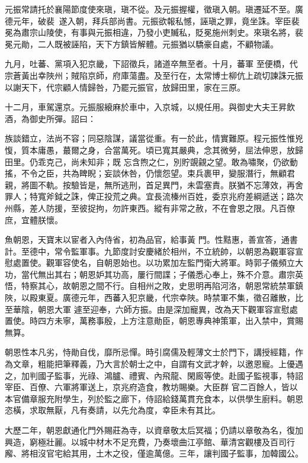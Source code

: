 \begin{pinyinscope}
 元振常請托於襄陽節度使來瑱，瑱不從。及元振握權，徵瑱入朝。瑱遷延不至。廣德元年，破裴，遂入朝，拜兵部尚書。元振欲報私憾，誣瑱之罪，竟坐誅。宰臣裴冕為肅宗山陵使，有事與元振相違，乃發小吏贓私，貶冕施州刺史。來瑱名將，裴冕元勛，二人既被誣陷，天下方鎮皆解體。元振猶以驕豪自處，不顧物議。



 九月，吐蕃、黨項入犯京畿，下詔徵兵，諸道卒無至者。十月，蕃軍
 至便橋，代宗蒼黃出幸陜州；賊陷京師，府庫蕩盡。及至行在，太常博士柳伉上疏切諫誅元振以謝天下，代宗顧人情歸咎，乃罷元振官，放歸田里，家在三原。



 十二月，車駕還京。元振服縗麻於車中，入京城，以規任用。與御史大夫王昇飲酒，為御史所彈。詔曰：



 族談錯立，法尚不容；同惡陰謀，議當從重。有一於此，情實難原。程元振性惟兇愎，質本庸愚，蕞爾之身，合當萬死。頃已寬其嚴典，念其微勞，屈法伸恩，放歸田里。仍乖克己，尚未知非；既
 忘含煦之仁，別貯覬覦之望。敢為嘯聚，仍欲動搖，不令之臣，共為睥睨；妄談休咎，仍懷怨望。束兵裹甲，變服潛行，無顧君親，將圖不軌。按驗皆是，無所逃刑，首足異門，未雲塞責。朕猶不忘薄效，再舍罪人；特寬斧鉞之誅，俾正投荒之典。宜長流榛州百姓，委京兆府差綱遞送；路次州縣，差人防援，至彼捉拘，勿許東西。縱有非常之赦，不在會恩之限。凡百僚庶，宜體朕懷。



 魚朝恩，天寶末以宦者入內侍省，初為品官，給事黃
 門。性黠惠，善宣答，通書計。至德中，常令監軍事。九節度討安慶緒於相州，不立統帥，以朝恩為觀軍容宣慰處置使。觀軍容使名，自朝恩始也。以功累加左監門衛大將軍。時郭子儀頻立大功，當代無出其右；朝恩妒其功高，屢行間諜；子儀悉心奉上，殊不介意。肅宗英悟，特察其心，故朝恩之間不行。自相州之敗，史思明再陷河洛，朝恩常統禁軍鎮陜，以殿東夏。廣德元年，西蕃入犯京畿，代宗幸陜。時禁軍不集，徵召離散，比至華陰，朝恩大軍
 遽至迎奉，六師方振。由是深加寵異，改為天下觀軍容宣慰處置使。時四方未寧，萬務事殷，上方注意勛臣，朝恩專典神策軍，出入禁中，賞賜無算。



 朝恩性本凡劣，恃勛自伐，靡所忌憚。時引腐儒及輕薄文士於門下，講授經籍，作為文章，粗能把筆釋義，乃大言於朝士之中，自謂有文武才幹，以邀恩寵。上優遇之，加判國子監事，光祿、鴻臚、禮賓、內飛龍、閑廄等使。赴國子監視事，特詔宰臣、百僚、六軍將軍送上，京兆府造食，教坊賜樂。大臣群
 官二百餘人，皆以本官備章服充附學生，列於監之廊下，侍詔給錢萬貫充食本，以供學生廚料。朝恩恣橫，求取無厭，凡有奏請，以先允為度，幸臣未有其比。



 大歷二年，朝恩獻通化門外賜莊為寺，以資章敬太后冥福；仍請以章敬為名，復加興造，窮極壯麗。以城中材木不足充費，乃奏壞曲江亭館、華清宮觀樓及百司行廨、將相沒官宅給其用，土木之役，僅逾萬億。三年，讓判國子監事，加韓國公。




\end{pinyinscope}
